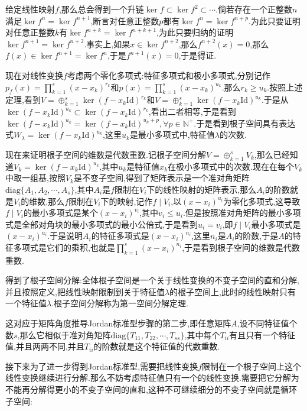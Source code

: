 给定线性映射$f$,那么总会得到一个升链$\ker f\subset\ker f^2\subset\cdots$.倘若存在一个正整数$n$满足$\ker f^n=\ker f^{n+1}$,断言对任意正整数$p$都有$\ker f^n=\ker f^{n+p}$.为此只要证明对任意正整数$k$有$\ker f^{n+k}=\ker f^{n+k+1}$,为此只要归纳的证明$\ker f^{n+1}=\ker f^{n+2}$.事实上,如果$x\in\ker f^{n+2}$,那么$f^{n+2}(x)=0$,那么$f(x)\in\ker f^{n+1}=\ker f^n$,于是$f^{n+1}(x)=0$,于是得证.

现在对线性变换$f$考虑两个零化多项式:特征多项式和极小多项式,分别记作$p_f(x)=\prod_{k=1}^{s}(x-x_k)^{r_k}$和$p(x)=\prod_{k=1}^{s}(x-x_k)^{u_k}$.那么$r_k\ge u_k$.按照上述定理,看到$V=\oplus_{k=1}^s\ker(f-x_k\mathrm{Id})^{r_k}$和$V=\oplus_ {k=1}^s\ker(f-x_k\mathrm{Id})^{u_k}$.于是从$\ker(f-x_k\mathrm{Id})^{u_k}\subset\ker(f-x_k\mathrm{Id})^{r_k}$,看出二者相等,于是看到$\ker(f-x_k\mathrm{Id})^ {u_k}=\ker(f-x_k\mathrm{Id})^{u_k+p},\forall p\in\mathbb{N^+}$.于是看到根子空间具有表达式$W_{\lambda}=\ker(f-x_k\mathrm{Id})^ {u_k}$,这里$u_k$是最小多项式中,特征值$\lambda$的次数.

现在来证明根子空间的维数是代数重数.记根子空间分解$V=\oplus_ {k=1}^sV_k$,那么已经知道$V_k=\ker(f-x_k\mathrm{Id})^{u_k}$,其中$u_k$是特征值$x_k$在极小多项式中的次数.现在在每个$V_k$中取一组基,按照$V_k$是不变子空间,得到了矩阵表示是一个准对角矩阵$\mathrm{diag}\{A_1,A_2,\cdots,A_s\}$,其中$A_i$是$f$限制在$V_i$下的线性映射的矩阵表示,那么$A_i$的阶数就是$V_i$的维数.那么$f$限制在$V_i$下的映射,记作$f\mid V_i$,以$(x-x_i)^{u_i}$为零化多项式,这导致$f\mid V_i$的最小多项式是某个$(x-x_i)^{v_i}$,其中$v_i\le u_i $.但是按照准对角矩阵的最小多项式是全部对角块的最小多项式的最小公倍式,于是看到$u_i=v_i$,即$f\mid V_i$最小多项式是$(x-x_i)^{u_i}$.于是说明$A_i$的特征多项式是$(x-x_i)^{n_i}$,这里$n_i$是$A_i$的阶数,于是$A$的特征多项式是它们的乘积,也就是$\prod_{k=1}^{s}(x-x_i)^{n_i}$,于是看到根子空间的维数是代数重数.

得到了根子空间分解:全体根子空间是一个关于线性变换的不变子空间的直和分解,并且按照定义,把线性映射限制到关于特征值$\lambda$的根子空间上,此时的线性映射只有一个特征值$\lambda$.根子空间分解称为第一空间分解定理.

这对应于矩阵角度推导Jordan标准型步骤的第二步,即任意矩阵$A$,设不同特征值个数$s$,那么它相似于准对角矩阵$\mathrm{diag}\{T_{11},T_{22},\cdots,T_{ss}\}$,其中每个$T_{ii}$有且只有一个特征值,并且两两不同,并且$T_{ii}$的阶数就是这个特征值的代数重数.

接下来为了进一步得到Jordan标准型,需要把线性变换$f$限制在一个根子空间上这个线性变换继续进行分解.那么不妨考虑特征值只有一个的线性变换.需要把它分解为不能再分解得更小的不变子空间的直和,这种不可继续细分的不变子空间就是循环子空间:

